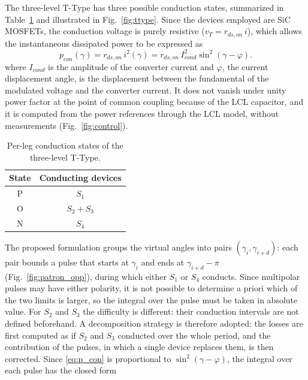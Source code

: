 \documentclass[conference]{IEEEtran}
\begin{document}
The three-level T-Type has three possible conduction states, summarized in
Table~\ref{tab:estados_cond} and illustrated in Fig.~\ref{fig:ttype}. Since the
devices employed are SiC MOSFETs, the conduction voltage is purely resistive
($v_T = r_{ds,on}\,i$), which allows the instantaneous dissipated power to be
expressed as
\begin{equation}
    p_{con}(\gamma) = r_{ds,on}\,i^2(\gamma)
                    = r_{ds,on}\,I_{cond}^2\sin^2(\gamma-\varphi).
    \label{eq:p_con}
\end{equation}
where $I_{cond}$ is the amplitude of the converter current and
$\varphi$, the current displacement angle, is the displacement between the
fundamental of the modulated voltage and the converter current. It does not
vanish under unity
power factor at the point of common coupling because of the LCL capacitor,
and it is computed from the power references through the LCL model,
without measurements (Fig.~\ref{fig:control}).
\begin{table}[!t]
    \centering
    \caption{Per-leg conduction states of the three-level T-Type.}
    \bgroup
    \def\arraystretch{1.0}
    \begin{tabular}{c c}         \toprule
            \rowcolor{Gray}
        State & Conducting devices \\ \midrule
        P & $S_1$ \\
        O & $S_2 + S_3$ \\
        N & $S_4$ \\
        \bottomrule
    \end{tabular}
    \egroup
    \label{tab:estados_cond}
\end{table}
The proposed formulation groups the virtual angles into pairs
$(\gamma_i,\gamma_{i+d})$: each pair bounds a pulse that starts at $\gamma_i$
and ends at $\gamma_{i+d}-\pi$ (Fig.~\ref{fig:patron_opp}), during which
either $S_1$ or $S_4$ conducts. Since multipolar pulses may have either
polarity, it is not possible to determine a priori which of the two limits is
larger, so the integral over the pulse must be taken in absolute value. For
$S_2$ and $S_3$ the difficulty is different: their conduction intervals are
not defined beforehand. A decomposition strategy is therefore adopted: the
losses are first computed as if $S_2$ and $S_3$ conducted over the whole
period, and the contribution of the pulses, in which a single device replaces
them, is then corrected. Since \eqref{eq:p_con} is proportional to
$\sin^2(\gamma-\varphi)$, the integral over each pulse has the closed form
\end{document}
